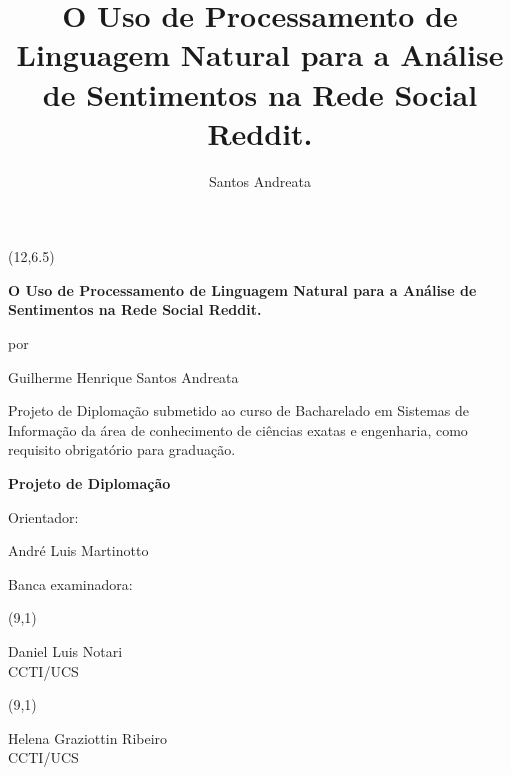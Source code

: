 \documentclass{iiufrgs}
\title{O Uso de Processamento de Linguagem Natural para a Análise de
Sentimentos na Rede Social Reddit.}
\author{Santos Andreata}{Guilherme Henrique}
\begin{document}
\maketitle  

\begin{titlepage}
\vfill

\begin{center}
{\setlength{\unitlength}{1cm}\makebox(12,6.5){\parbox[c]{12cm}{\setlength{\parskip}{0.8cm}\center\vskip -1.2cm\LARGE{\bf O Uso de Processamento de Linguagem Natural para a Análise de Sentimentos na
Rede Social Reddit.}\par \normalsize por\par \large Guilherme Henrique
Santos Andreata\par}}}
\end{center}

{\large Projeto de Diplomação submetido ao curso de Bacharelado em Sistemas de
Informação da área de conhecimento de ciências exatas e engenharia, como requisito obrigatório para graduação.}

\vfill

\begin{center}
{\Large\bf Projeto de Diplomação}
\end{center}

\vfill

\begin{singlespace}
Orientador: {André Luis Martinotto\par}

Banca examinadora:\par
\hspace{1cm} {\setlength{\unitlength}{1cm}
\makebox(9,1){\parbox[c]{9cm}{\center Daniel Luis Notari\\ CCTI/UCS}}}\par
\hspace{1cm} {\setlength{\unitlength}{1cm}
\makebox(9,1){\parbox[c]{9cm}{\center Helena Graziottin Ribeiro\\ CCTI/UCS}}}\par

\vfill


\end{singlespace}

\end{titlepage}
\end{document}
